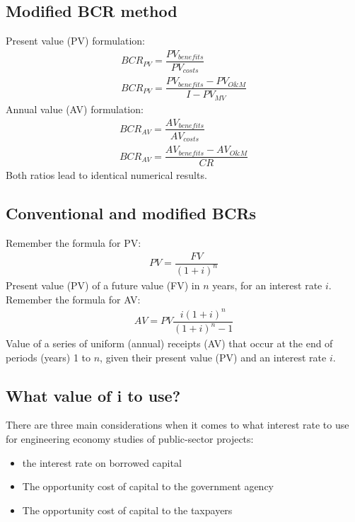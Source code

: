 \subsection{Modified BCR method}
Present value (PV) formulation:
\begin{gather}
  BCR_{PV} = \dfrac{PV_{benefits}}{PV_{costs}}\\
  BCR_{PV} = \dfrac{PV_{benefits} - PV_{O\&M}}{I - PV_{MV}}
\end{gather}
Annual value (AV) formulation:
\begin{gather}
  BCR_{AV} = \dfrac{AV_{benefits}}{AV_{costs}}\\
  BCR_{AV} = \dfrac{AV_{benefits}-AV_{O\&M}}{CR}
\end{gather}
Both ratios lead to identical numerical results.
\subsection{Conventional and modified BCRs}
Remember the formula for PV:
\begin{gather}
  PV = \dfrac{FV}{(1+i)^n}
\end{gather}
Present value (PV) of a future value (FV) in $n$ years, for an interest rate $i$.
Remember the formula for AV:
\begin{gather}
  AV = PV\dfrac{i(1+i)^n}{(1+i)^n - 1}
\end{gather}
Value of a series of uniform (annual) receipts (AV) that occur at the end of periods (years) 1 to $n$, given their present value (PV) and an interest rate $i$.
\subsection{What value of i to use?}
There are three main considerations when it comes to what interest rate to use for engineering economy studies of public-sector projects:
\begin{itemize}
  \item the interest rate on borrowed capital
  \item The opportunity cost of capital to the government agency
  \item The opportunity cost of capital to the taxpayers
\end{itemize}
